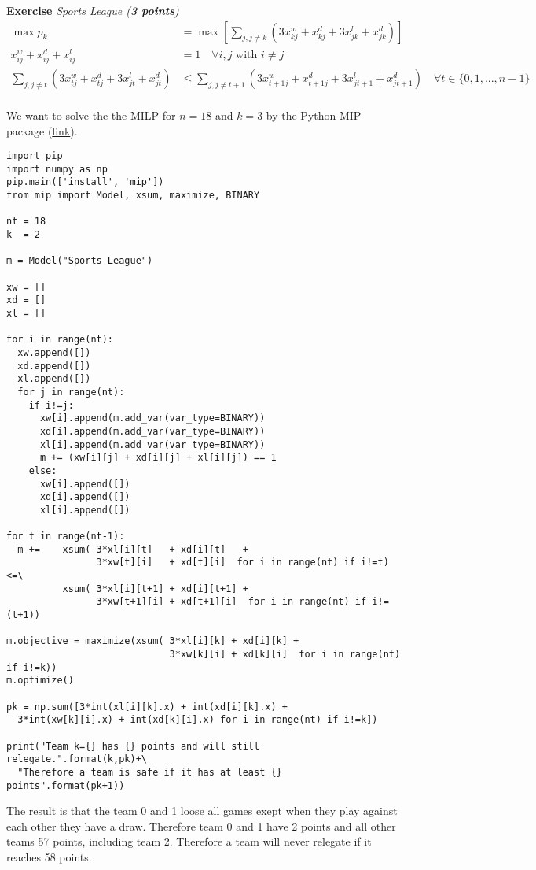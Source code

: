 \documentclass[a4paper,10pt]{article}
\newcounter{exc}
\newenvironment{exercise}[1]%
{\refstepcounter{exc}\textbf{Exercise \arabic{exc}} \emph{#1}\\}
{

\hrulefill\medskip}%
\begin{document}
\begin{exercise}{Sports League (\textbf{3 points})}
\begin{align}
  \max p_k &= \max \left[ \sum_{j,j\neq k} (3x^w_{kj}+ x^d_{kj} + 3x^l_{jk}+ x^d_{jk}) \right] \\
  x^w_{ij}+ x^d_{ij}+ x^l_{ij}& = 1 \quad \forall i,j \text{ with } i \neq j \\
  \sum_{j,j\neq t} (3x^w_{tj}+ x^d_{tj} + 3x^l_{jt}+ x^d_{jt})& \leq 
  \sum_{j,j\neq t+1} (3x^w_{t+1j}+ x^d_{t+1j} + 3x^l_{jt+1}+ x^d_{jt+1}) \quad \forall t\in\{0,1,...,n-1\}\\
\end{align}

We want to solve the the MILP for $n=18$ and $k=3$ by the Python MIP package (\href{https://pypi.org/project/mip/}{link}).


\begin{lstlisting}[style = Python]
import pip
import numpy as np
pip.main(['install', 'mip'])
from mip import Model, xsum, maximize, BINARY

nt = 18
k  = 2

m = Model("Sports League")

xw = []
xd = []
xl = []

for i in range(nt):
  xw.append([])
  xd.append([])
  xl.append([])
  for j in range(nt):
    if i!=j:
      xw[i].append(m.add_var(var_type=BINARY))
      xd[i].append(m.add_var(var_type=BINARY))
      xl[i].append(m.add_var(var_type=BINARY))
      m += (xw[i][j] + xd[i][j] + xl[i][j]) == 1
    else:
      xw[i].append([])
      xd[i].append([])
      xl[i].append([])

for t in range(nt-1):
  m +=    xsum( 3*xl[i][t]   + xd[i][t]   +
                3*xw[t][i]   + xd[t][i]  for i in range(nt) if i!=t) <=\
          xsum( 3*xl[i][t+1] + xd[i][t+1] +
                3*xw[t+1][i] + xd[t+1][i]  for i in range(nt) if i!=(t+1))

m.objective = maximize(xsum( 3*xl[i][k] + xd[i][k] +
                             3*xw[k][i] + xd[k][i]  for i in range(nt) if i!=k))
m.optimize()

pk = np.sum([3*int(xl[i][k].x) + int(xd[i][k].x) +
  3*int(xw[k][i].x) + int(xd[k][i].x) for i in range(nt) if i!=k])

print("Team k={} has {} points and will still relegate.".format(k,pk)+\
  "Therefore a team is safe if it has at least {} points".format(pk+1))
\end{lstlisting}
The result is that the team 0 and 1 loose all  games exept when they play against each other they have a draw. Therefore team 0 and 1 have 2 points and all other teams 57 points, including team 2. Therefore a team will never relegate if it reaches 58 points.
\end{exercise}
\end{document}
